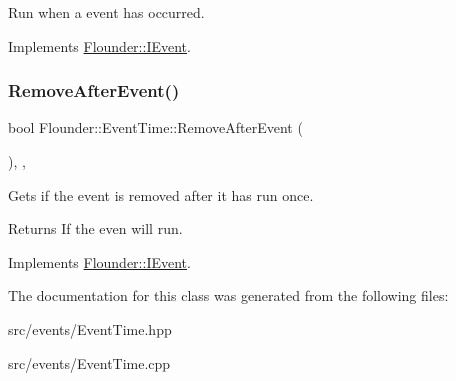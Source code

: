 Run when a event has occurred. 



Implements \hyperlink{class_flounder_1_1_i_event_a67f7265c6decfdf4d29b94a088f45501}{Flounder\+::\+I\+Event}.

\mbox{\label{class_flounder_1_1_event_time_a58f3a1e64668b27e3395d95a7432181a}} 
\subsubsection{\texorpdfstring{Remove\+After\+Event()}{RemoveAfterEvent()}}
{\footnotesize\ttfamily bool Flounder\+::\+Event\+Time\+::\+Remove\+After\+Event (\begin{DoxyParamCaption}{ }\end{DoxyParamCaption})\hspace{0.3cm}{\ttfamily [inline]}, {\ttfamily [override]}, {\ttfamily [virtual]}}



Gets if the event is removed after it has run once. 

\begin{DoxyReturn}{Returns}
If the even will run. 
\end{DoxyReturn}


Implements \hyperlink{class_flounder_1_1_i_event_a69893f543c31d93243833a4df1afa041}{Flounder\+::\+I\+Event}.



The documentation for this class was generated from the following files\+:\begin{DoxyCompactItemize}
\item 
src/events/Event\+Time.\+hpp\item 
src/events/Event\+Time.\+cpp\end{DoxyCompactItemize}
